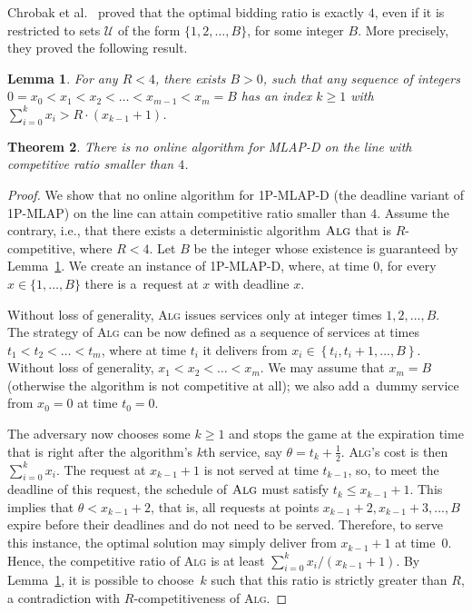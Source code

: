 \documentclass[a4paper]{article}
\newtheorem{theorem}{Theorem}[section]
\newtheorem{lemma}[theorem]{Lemma}
\newcommand{\braced}[1]{{ \left\{ #1 \right\} }}
\newcommand{\half}{{\mbox{$\frac{1}{2}$}}}
\newcommand{\MLAPD}{\mbox{\rm\textsf{MLAP-D}}}
\newcommand{\SPMLAP}{\mbox{\rm\textsf{1P-MLAP}}}
\newcommand{\SPMLAPD}{\mbox{\rm\textsf{1P-MLAP-D}}}
\newcommand{\expiration}{\theta}
\newcommand{\ALG}{\textsc{Alg}}
\begin{document}
Chrobak et al.~\cite{online-bidding} proved that the optimal bidding ratio is exactly $4$, even if it is 
restricted to sets $\mathcal{U}$  of the form $\{1,2,\ldots,B\}$, for some integer $B$. 
More precisely, they proved the following result.

\begin{lemma}
\label{lem:online_bidding}
For any $R < 4$, there exists $B > 0$, such that any sequence of integers 
$0 = x_0 < x_1 < x_2 < \ldots < x_{m-1} < x_m = B$ has an index $k \geq 1$ with
$\sum_{i=0}^k x_i > R \cdot (x_{k-1} + 1)$.
\end{lemma}


\begin{theorem}
\label{thm:mlapd_path_lower_bound}
There is no online algorithm for {\MLAPD} on the line with competitive ratio smaller than $4$.
\end{theorem}


\begin{proof}
We show that no online algorithm for {\SPMLAPD} (the deadline variant of {\SPMLAP}) 
on the line can attain competitive ratio smaller than $4$. 
Assume the contrary, i.e., that there exists a deterministic algorithm $\ALG$ that is $R$-competitive,
where $R < 4$. 
Let $B$ be the integer whose existence is guaranteed by Lemma~\ref{lem:online_bidding}.
We create an instance of {\SPMLAPD}, where, at time $0$,
for every $x \in \{1,\ldots,B\}$  there is a~request at $x$ with deadline $x$.

Without loss of generality, {\ALG} issues services only at integer times $1,2,...,B$.
The strategy of {\ALG} can be now defined as a sequence of services at times 
$t_1 < t_2 < \ldots < t_m$, where at time $t_i$ it delivers from 
$x_i \in \braced{t_i,t_i+1,...,B}$.  Without loss of
generality, $x_1 < x_2 < \ldots < x_m$. We may assume that $x_m = B$ (otherwise
the algorithm is not competitive at all); we also add a~dummy service from $x_0 = 0$ at time $t_0 = 0$.

The adversary now chooses some $k \geq 1$ and stops the game at the expiration time that is right after
the algorithm's $k$th service, say $\expiration = t_k+\half$.
{\ALG}'s cost is then $\sum_{i=0}^k x_i$. 
The request at $x_{k-1}+1$ is not served at time $t_{k-1}$, so, to meet the deadline of this request,
the schedule of $\ALG$ must satisfy $t_k \leq x_{k-1}+1$.  
This implies that $\expiration < x_{k-1}+2$, that is,
all requests at points $x_{k-1}+2, x_{k-1}+3,...,B$ expire 
before their deadlines and do not need to be served.
Therefore, to serve this instance, 
the optimal solution may simply deliver from $x_{k-1}+1$ at time~$0$. 
Hence, the competitive ratio of {\ALG} is at least 
$\sum_{i=0}^k x_i / (x_{k-1}+1)$. By Lemma~\ref{lem:online_bidding}, it is possible to choose~$k$
such that this ratio is strictly greater than $R$, a contradiction with 
$R$-competitiveness of {\ALG}.
\end{proof}
\end{document}
